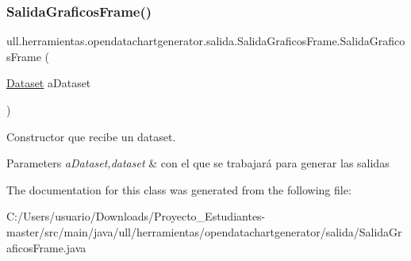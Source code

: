 \subsubsection{\texorpdfstring{Salida\+Graficos\+Frame()}{SalidaGraficosFrame()}}
{\footnotesize\ttfamily ull.\+herramientas.\+opendatachartgenerator.\+salida.\+Salida\+Graficos\+Frame.\+Salida\+Graficos\+Frame (\begin{DoxyParamCaption}\item[{\mbox{\hyperlink{classull_1_1herramientas_1_1opendatachartgenerator_1_1_dataset}{Dataset}}}]{a\+Dataset }\end{DoxyParamCaption})}



Constructor que recibe un dataset. 


\begin{DoxyParams}{Parameters}
{\em a\+Dataset,dataset} & con el que se trabajará para generar las salidas \\
\hline
\end{DoxyParams}


The documentation for this class was generated from the following file\+:\begin{DoxyCompactItemize}
\item 
C\+:/\+Users/usuario/\+Downloads/\+Proyecto\+\_\+\+Estudiantes-\/master/src/main/java/ull/herramientas/opendatachartgenerator/salida/Salida\+Graficos\+Frame.\+java\end{DoxyCompactItemize}
